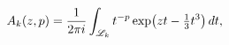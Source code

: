 \[\mathop{A_{k}\/}\nolimits\!\left(z,p\right)=\frac{1}{2\pi i}\int_{\mathscr{L}_%
{k}}t^{-p}\mathop{\exp\/}\nolimits\!\left(zt-\tfrac{1}{3}t^{3}\right)dt,\]